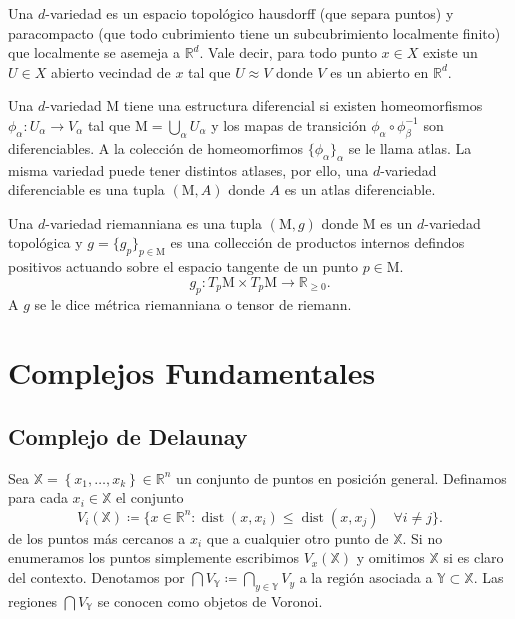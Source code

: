 \documentclass[legalpaper,12pt]{article}
\newcommand{\X}{\mathbb{X}}
\newcommand{\Y}{\mathbb{Y}}
\newcommand{\R}{\mathbb{R}}
\newcommand{\MM}{\mathrm{M}}
\DeclareMathOperator{\dist}{dist}
\begin{document}
Una \(d\)-variedad es un espacio topológico hausdorff (que separa puntos) y paracompacto
(que todo cubrimiento tiene un subcubrimiento localmente finito) que localmente se asemeja
a \(\R^d\). Vale decir, para todo punto \(x\in X\) existe un \(U\in X\) abierto vecindad de \(x\) 
tal que \(U\approx V\) donde \(V\) es un abierto en \(\R^d\).   

Una \(d\)-variedad \(\MM\) tiene una estructura diferencial si existen homeomorfismos
\(\phi_{\alpha} \colon U_{\alpha} \to V_{\alpha}\) tal que \(\MM = \bigcup_{\alpha} U_{\alpha}\)
y los mapas de transición \(\phi_{\alpha}\circ\phi_{\beta}^{-1}\) son diferenciables.
A la colección de homeomorfimos \(\lbrace \phi_{\alpha} \rbrace_{\alpha}\) se le 
llama atlas. La misma variedad puede tener distintos atlases, por ello, una \(d\)-variedad
diferenciable es una tupla \((\MM, A)\) donde \(A\) es un atlas diferenciable.

Una \(d\)-variedad riemanniana es una tupla \((\MM,g)\) donde \(\MM\) es un \(d\)-variedad topológica
y \(g = \lbrace g_p \rbrace_{p\in \MM}\) es una collección de productos internos defindos positivos
actuando sobre el espacio tangente de un punto \(p\in \MM\).
\begin{displaymath}
  g_p \colon T_p \MM \times T_p \MM \to \R_{\ge 0}.
\end{displaymath}
A \(g\) se le dice métrica riemanniana o tensor de riemann. 

\section{Complejos Fundamentales}

\subsection{Complejo de Delaunay}

Sea \(\X = \left\{ x_1, \dots, x_k \right\} \in \R^n\) un conjunto de puntos en posición
general. Definamos para cada \(x_i\in \X\) el conjunto
\begin{displaymath}
  V_i(\X) \coloneqq \lbrace x\in \R^n \colon \dist(x,x_i) \le \dist(x,x_j)\quad \forall i\ne j\rbrace.
\end{displaymath}
de los puntos más cercanos a \(x_i\) que a cualquier otro punto de \(\X\). Si no enumeramos
los puntos simplemente escribimos \(V_{x}(\X)\) y omitimos \(\X\) si es claro del contexto.  
Denotamos por \(\bigcap V_{\Y} \coloneqq \bigcap_{y\in \Y} V_{y}\) a la región asociada
a \(\Y\subset \X\). Las regiones \(\bigcap V_{\Y}\) se conocen como objetos de Voronoi.
\end{document}
